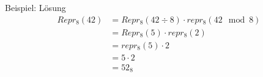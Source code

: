 \begin{frame}{Beispiel: Lösung}
	\begin{align*}
		Repr_8(42) &= Repr_8(42 \div 8) \cdot repr_8(42 \mod 8) \\
		&= Repr_8(5) \cdot repr_8(2)\\
		&= repr_8(5) \cdot 2\\
		&= 5 \cdot 2\\
		&= 52_8
	\end{align*}
	
\end{frame}
